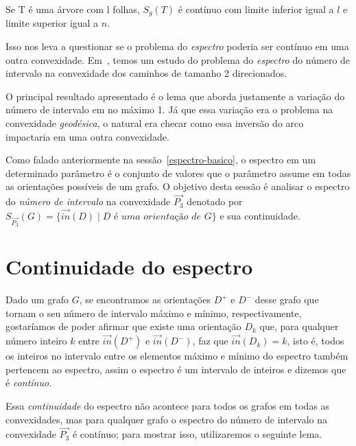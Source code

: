 \begin{theorem}
	Se T é uma árvore com l folhas, $S_g(T)$ é contínuo com limite inferior igual a $l$ e limite superior igual a $n$.
\end{theorem}

Isso nos leva a questionar se o problema do \emph{espectro} poderia ser contínuo em uma outra convexidade. Em~\cite{ALVARO2026}, temos um estudo do problema do \emph{espectro} do número de intervalo na convexidade dos caminhos de tamanho 2 direcionados.

O principal resultado apresentado é o lema que aborda justamente a variação do número de intervalo em no máximo 1. Já que essa variação era o problema na convexidade \emph{geodésica}, o natural era checar como essa inversão do arco impactaria em uma outra convexidade.

Como falado anteriormente na sessão~\ref{espectro-basico}, o espectro em um determinado parâmetro é o conjunto de valores que o parâmetro assume em todas as orientações possíveis de um grafo. O objetivo desta sessão é analisar o espectro do \textit{número de intervalo} na convexidade $\overrightarrow{P_3}$ denotado por $S_{\overrightarrow{P_3}}(G) = \{\overrightarrow{in}(D) \mid \textit{D é uma orientação de G}\}$ e sua continuidade.

\section{Continuidade do espectro}

Dado um grafo $G$, se encontramos as orientações $D^+$ e $D^-$ desse grafo que tornam o seu número de intervalo máximo e mínimo, respectivamente, gostaríamos de poder afirmar que existe uma orientação $D_k$ que, para qualquer número inteiro $k$ entre $\overrightarrow{in}(D^+)$ e $\overrightarrow{in}(D^-)$, faz que $\overrightarrow{in}(D_k)=k$, isto é, todos os inteiros no intervalo entre os elementos máximo e mínimo do espectro também pertencem ao espectro, assim o espectro é um intervalo de inteiros e dizemos que é \textit{contínuo}.

Essa \textit{continuidade} do espectro não acontece para todos os grafos em todas as convexidades, mas para qualquer grafo o espectro do número de intervalo na convexidade $\overrightarrow{P_3}$ é contínuo; para mostrar isso, utilizaremos o seguinte lema.

